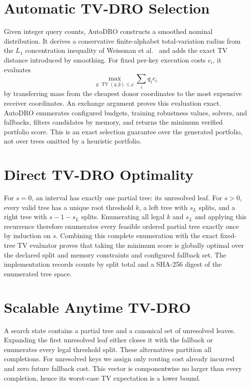 \documentclass[10pt]{article}
\begin{document}
\section{Automatic TV-DRO Selection}
Given integer query counts, AutoDRO constructs a smoothed nominal distribution.
It derives a conservative finite-alphabet total-variation radius from the
$L_1$ concentration inequality of Weissman et al.\ \cite{weissman2003} and
adds the exact TV distance introduced by smoothing. For fixed per-key execution
costs $c_i$, it evaluates
\[
\max_{q:\operatorname{TV}(q,\hat p)\leq\rho}\sum_i q_i c_i
\]
by transferring mass from the cheapest donor coordinates to the most
expensive receiver coordinates. An exchange argument proves this evaluation
exact. AutoDRO enumerates configured budgets, training robustness values,
solvers, and fallbacks, filters candidates by memory, and returns the minimum
verified portfolio score. This is an exact selection guarantee over the
generated portfolio, not over trees omitted by a heuristic portfolio.

\section{Direct TV-DRO Optimality}
For $s=0$, an interval has exactly one partial tree: its unresolved leaf. For
$s>0$, every valid tree has a unique root threshold $k$, a left tree with
$s_L$ splits, and a right tree with $s-1-s_L$ splits. Enumerating all legal
$k$ and $s_L$ and applying this recurrence therefore enumerates every feasible
ordered partial tree exactly once by induction on $s$. Combining this complete
enumeration with the exact fixed-tree TV evaluator proves that taking the
minimum score is globally optimal over the declared split and memory
constraints and configured fallback set. The implementation records counts by
split total and a SHA-256 digest of the enumerated tree space.

\section{Scalable Anytime TV-DRO}
A search state contains a partial tree and a canonical set of unresolved
leaves. Expanding the first unresolved leaf either closes it with the fallback
or enumerates every legal threshold split. These alternatives partition all
completions. For unresolved keys we assign only routing cost already incurred
and zero future fallback cost. This vector is componentwise no larger than
every completion, hence its worst-case TV expectation is a lower bound.
\end{document}
